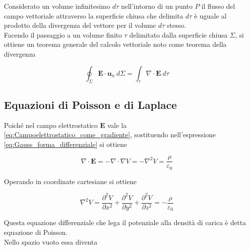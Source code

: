 Considerato un volume infinitesimo $d \tau$ nell'intorno di un punto $P$ il flusso del campo vettoriale attraverso la superficie chiusa che delimita $d \tau$ è uguale al prodotto della divergenza del vettore per il volume $d \tau$ stesso. \\

Facendo il passaggio a un volume finito $\tau$ delimitato dalla superficie chiusa $\Sigma$, si ottiene un teorema  generale del calcolo vettoriale noto come teorema della divergenza 

\begin{tcolorbox}[colback=yellow!10!white, colframe=orange!70!black, boxrule=0.8pt]
\begin{equation}
    \oint _{\Sigma} \mathbf{E} \cdot \mathbf{u}_n \ d \Sigma = \int_{\tau} \nabla \cdot \mathbf{E}\ d \tau
\end{equation}
\end{tcolorbox}

\subsection{Equazioni di Poisson e di Laplace}

Poiché nel campo elettrostatico $\mathbf{E}$ vale la \ref{eq:Campoelettrostatico_come_gradiente}, sostituendo nell'espressione \ref{eq:Gauss_forma_differenziale} si ottiene 

\begin{equation}
    \nabla \cdot \mathbf{E} = - \nabla \cdot \nabla V = -\nabla^2 V  = \frac{\rho}{\varepsilon_0}
\end{equation}

Operando in coordinate cartesiane si ottiene 

\begin{tcolorbox}[colback=yellow!10!white, colframe=orange!70!black, boxrule=0.8pt]
\begin{equation}
    \nabla ^2 V = \frac{\partial^2 V}{\partial x^2} + \frac{\partial^2 V}{\partial y^2} + \frac{\partial^2 V}{\partial z^2} = - \frac{\rho}{\varepsilon_0}
    \label{eq:equazione_di_Poisson}
\end{equation}
\end{tcolorbox}

Questa equazione differenziale che lega il potenziale alla densità di carica è detta equazione di Poisson. \\

Nello spazio vuoto essa diventa

